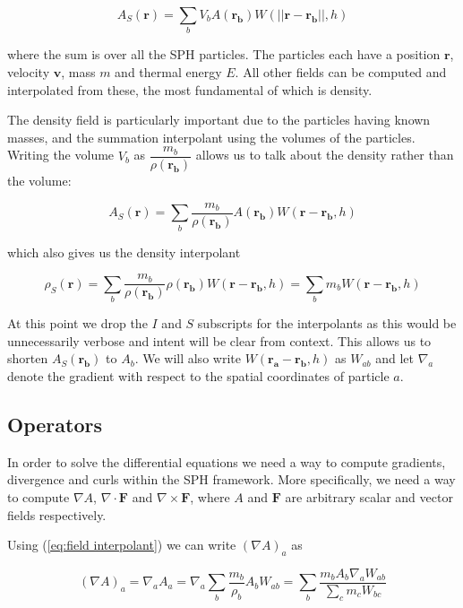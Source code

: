 \documentclass[../main.tex]{subfiles}
\begin{document}
\begin{equation}
    A_S(\bm{r})
    = \sum_{b} V_b A(\bm{r_b}) W(||\bm{r} - \bm{r_b}||, h)
\end{equation}

where the sum is over all the SPH particles. The particles each have a position $\bm{r}$, velocity
$\bm{v}$, mass $m$ and thermal energy $E$. All other fields can be computed and interpolated
from these, the most fundamental of which is density.

The density field is particularly important due to the particles having known masses, and the
summation interpolant using the volumes of the particles. Writing the volume $V_b$ as
$\dfrac{m_b}{\rho(\bm{r_b})}$ allows us to talk about the density rather than the volume:

\begin{equation} \label{eq:field interpolant}
    A_S(\bm{r})
    = \sum_{b} \frac{m_b}{\rho(\bm{r_b})} A(\bm{r_b}) W(\bm{r} - \bm{r_b}, h)
\end{equation}

which also gives us the density interpolant

\begin{equation}
    \rho_S(\bm{r})
    = \sum_{b} \frac{m_b}{\rho(\bm{r_b})} \rho(\bm{r_b}) W(\bm{r} - \bm{r_b}, h)
    = \sum_{b} m_b W(\bm{r} - \bm{r_b}, h)
\end{equation}

At this point we drop the $I$ and $S$ subscripts for the interpolants as this would be
unnecessarily verbose and intent will be clear from context. This allows us to shorten
$A_S(\bm{r_b})$ to $A_b$. We will also write $W(\bm{r_a} - \bm{r_b}, h)$ as $W_{ab}$ and let
$\nabla_a$ denote the gradient with respect to the spatial coordinates of particle $a$.

\subsection{Operators}
In order to solve the differential equations we need a way to compute gradients, divergence and
curls within the SPH framework. More specifically, we need a way to compute
$\nabla A$, $\nabla\cdot\bm{F}$ and $\nabla\times\bm{F}$, where $A$ and $\bm{F}$ are arbitrary
scalar and vector fields respectively.

Using (\ref{eq:field interpolant}) we can write $(\nabla A)_a$ as

\begin{equation} \label{eq:naive gradient}
    (\nabla A)_a
    = \nabla_a A_a
    = \nabla_a \sum_b \frac{m_b}{\rho_b} A_b W_{ab}
    = \sum_b \frac{m_b A_b \nabla_a W_{ab}}{\sum_c m_c W_{bc}}
\end{equation}
\end{document}
